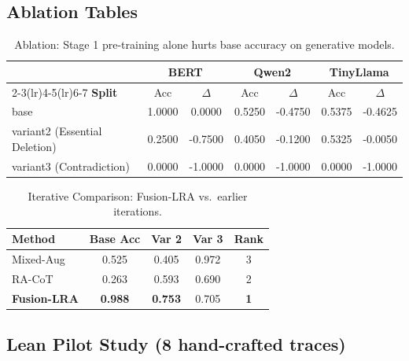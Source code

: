 \documentclass{article} %
\begin{document}
\subsection{Ablation Tables}
\label{app:ablation}

\begin{table}[h]
\centering\small
\caption{Ablation: Stage 1 pre-training alone hurts base accuracy on generative models.}
\label{tab:stage1_results}
\begin{tabular}{lcccccc}
\toprule
& \multicolumn{2}{c}{\textbf{BERT}} & \multicolumn{2}{c}{\textbf{Qwen2}} & \multicolumn{2}{c}{\textbf{TinyLlama}} \\
\cmidrule(lr){2-3}\cmidrule(lr){4-5}\cmidrule(lr){6-7}
\textbf{Split} & Acc & $\Delta$ & Acc & $\Delta$ & Acc & $\Delta$ \\
\midrule
base                            & 1.0000 & 0.0000 & 0.5250 & -0.4750 & 0.5375 & -0.4625 \\
variant2 (Essential Deletion)   & 0.2500 & -0.7500 & 0.4050 & -0.1200 & 0.5325 & -0.0050 \\
variant3 (Contradiction)        & 0.0000 & -1.0000 & 0.0000 & -1.0000 & 0.0000 & -1.0000 \\
\bottomrule
\end{tabular}
\end{table}

\begin{table}[h]
\centering\small
\caption{Iterative Comparison: Fusion-LRA vs.\ earlier iterations.}
\label{tab:final_performance_comparison}
\begin{tabular}{lcccc}
\toprule
\textbf{Method} & \textbf{Base Acc} & \textbf{Var 2} & \textbf{Var 3} & \textbf{Rank} \\
\midrule
Mixed-Aug              & 0.525          & 0.405          & 0.972          & 3 \\
RA-CoT                 & 0.263          & 0.593          & 0.690          & 2 \\
\midrule
\textbf{Fusion-LRA}    & \textbf{0.988} & \textbf{0.753} & 0.705          & \textbf{1} \\
\bottomrule
\end{tabular}
\end{table}

\subsection{Lean Pilot Study (8 hand-crafted traces)}
\label{app:lean-pilot}
\end{document}
